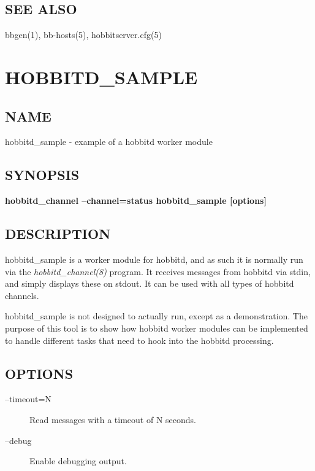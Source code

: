 \subsection{SEE ALSO}
bbgen(1), bb-hosts(5), hobbitserver.cfg(5) 


%
\newpage
\section{HOBBITD\_SAMPLE}
\subsection{NAME}
 hobbitd\_sample - example of a hobbitd worker module \subsection{SYNOPSIS}
\textbf{hobbitd\_channel --channel=status hobbitd\_sample [options]}

 
\subsection{DESCRIPTION}
 hobbitd\_sample is a worker module for hobbitd, and as such it is
 normally run via the \emph{hobbitd\_channel(8)} program. It receives
 messages from hobbitd via stdin, and simply displays these on
 stdout. It can be used with all types of hobbitd channels. 


  hobbitd\_sample is not designed to actually run, except as a
  demonstration. The purpose of this tool is to show how hobbitd
  worker modules can be implemented to handle different tasks that
  need to hook into the hobbitd processing. 


 
\subsection{OPTIONS}
\begin{description}
\item[--timeout=N] Read messages with a timeout of N seconds. 

 

\item[--debug] Enable debugging output. 

 


\end{description}
